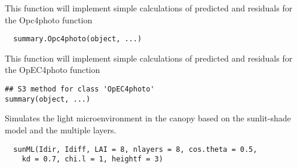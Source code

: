 \documentclass[letterpaper]{book}
\begin{document}
%
\begin{Arguments}
\begin{ldescription}
\item[\code{object}] 
\end{ldescription}
\end{Arguments}
%
\begin{Description}\relax
This function will implement simple calculations of
predicted and residuals for the Opc4photo function
\end{Description}
%
\begin{Usage}
\begin{verbatim}
  summary.Opc4photo(object, ...)
\end{verbatim}
\end{Usage}
%
\begin{Description}\relax
This function will implement simple calculations of
predicted and residuals for the OpEC4photo function
\end{Description}
%
\begin{Usage}
\begin{verbatim}
## S3 method for class 'OpEC4photo'
summary(object, ...)
\end{verbatim}
\end{Usage}
%
\begin{Description}\relax
Simulates the light microenvironment in the canopy based
on the sunlit-shade model and the multiple layers.
\end{Description}
%
\begin{Usage}
\begin{verbatim}
  sunML(Idir, Idiff, LAI = 8, nlayers = 8, cos.theta = 0.5,
    kd = 0.7, chi.l = 1, heightf = 3)
\end{verbatim}
\end{Usage}
%
\end{document}
